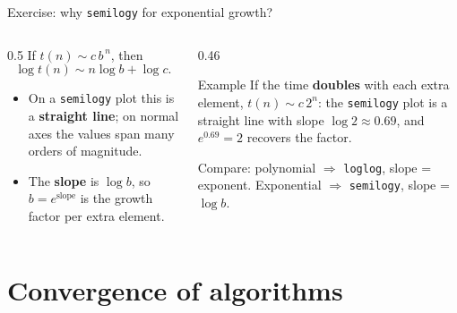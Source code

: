 \documentclass[aspectratio=169]{beamer}
\begin{document}
\begin{frame}{Exercise: why \texttt{semilogy} for exponential growth?}
\begin{columns}[T]
\begin{column}{0.5\textwidth}
\small
If $t(n) \sim c\, b^{\,n}$, then
\[
\log t(n) \sim n \log b + \log c .
\]
\begin{itemize}
  \item On a \texttt{semilogy} plot this is a \textbf{straight line}; on normal axes the values span many orders of magnitude.
  \item The \textbf{slope} is $\log b$, so $b = e^{\text{slope}}$ is the growth factor per extra element.
\end{itemize}
\end{column}
\begin{column}{0.46\textwidth}
\begin{exampleblock}{Example}
\small If the time \textbf{doubles} with each extra element, $t(n) \sim c\,2^{n}$: the \texttt{semilogy} plot is a straight line with slope $\log 2 \approx 0.69$, and $e^{0.69} = 2$ recovers the factor.
\end{exampleblock}
\scriptsize Compare: polynomial $\Rightarrow$ \texttt{loglog}, slope = exponent. Exponential $\Rightarrow$ \texttt{semilogy}, slope = $\log b$.
\end{column}
\end{columns}
\end{frame}

\section{Convergence of algorithms}
\end{document}
